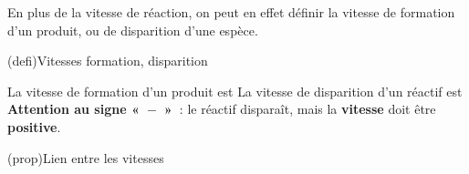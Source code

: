 \documentclass[../../main/main.tex]{subfiles}
\begin{document}
En plus de la vitesse de réaction, on peut en effet définir la vitesse de
formation d'un produit, ou de disparition d'une espèce.
\begin{tcb*}[label=def:vfordisp](defi){Vitesses formation, disparition}
	\begin{isd}
		La vitesse de formation d'un produit est
		\psw{%
			\[\boxed{v_{f,\ce{P}} = \dv{[\ce{P}]}{t}}\]
		}%
		\tcblower
		La vitesse de disparition d'un réactif est
		\psw{%
			\[\boxed{v_{d,\ce{R}} = -\dv{[\ce{R}]}{t}}\]
		}%
		\textbf{Attention au signe «~$-$~»~}: le réactif disparaît, mais la
		\textbf{vitesse} doit être \textbf{positive}.
	\end{isd}
	\vspace{-15pt}
\end{tcb*}

\begin{tcb*}[label=prop:vreacfordisp](prop){Lien entre les vitesses}
	\psw{%
		\[
			\boxed{v = \frac{1}{\nu_{\ce{X_i}}} \dv{[{\ce{X}}_i]}{t}}
			\Lra
			\boxed{%
				v_{d,\ce{R}} = -\nu_{\ce{R_i}} v = \abs{\nu_{\ce{R_i}}} v
			}%
			\qet
			\boxed{%
				v_{f,\ce{P}} = \nu_{\ce{P_i}} v
			}
		\]
	}%
\end{tcb*}
\end{document}
